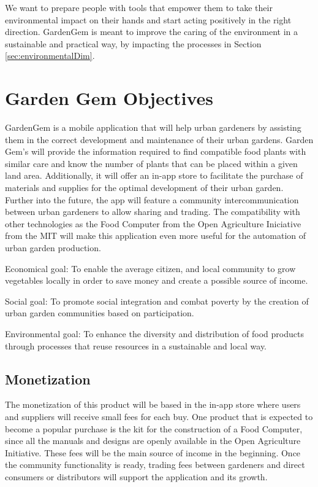 We want to prepare people with tools that empower them to take their environmental impact on their hands and start acting positively in the right direction. GardenGem is meant to improve the caring of the environment in a sustainable and practical way, by impacting the processes in Section \ref{sec:environmentalDim}.

\section{Garden Gem Objectives}

GardenGem is a mobile application that will help urban gardeners by assisting them in the correct development and maintenance of their urban gardens. Garden Gem’s will provide the information required to find compatible food plants with similar care and know the number of plants that can be placed within a given land area. Additionally, it will offer an in-app store to facilitate the purchase of materials and supplies for the optimal development of their urban garden. Further into the future, the app will feature a community intercommunication between urban gardeners to allow sharing and trading. The compatibility with other technologies as the Food Computer from the Open Agriculture Iniciative from the MIT will make this application even more useful for the automation of urban garden production.

Economical goal: To enable the average citizen, and local community to grow vegetables locally in order to save money and create a possible source of income. 

Social goal: To promote social integration and combat poverty by the creation of urban garden communities based on participation.

Environmental goal: To enhance the diversity and distribution of food products through processes that reuse resources in a sustainable and local way.

\subsection{Monetization}

The monetization of this product will be based in the in-app store where users and suppliers will receive small fees for each buy. One product that is expected to become a popular purchase is the kit for the construction of a Food Computer, since all the manuals and designs are openly available in the Open Agriculture Initiative. These fees will be the main source of income in the beginning. Once the community functionality is ready, trading fees between gardeners and direct consumers or distributors will support the application and its growth.

